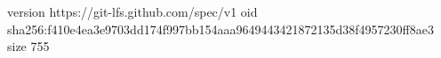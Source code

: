 version https://git-lfs.github.com/spec/v1
oid sha256:f410e4ea3e9703dd174f997bb154aaa9649443421872135d38f4957230ff8ae3
size 755
